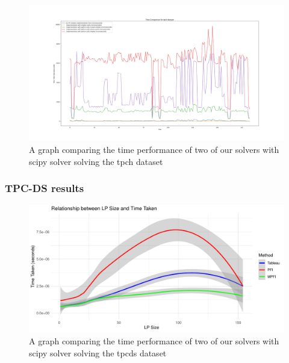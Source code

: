 \begin{figure}[p]
    \begin{adjustbox}{width=\paperwidth,center}
        \includegraphics[width=\paperwidth]{figures/all_scify_mpfi_pfi.png}
    \end{adjustbox}
    \caption{A graph comparing the time performance of two of
        our solvers with scipy solver solving the tpch dataset}
    \label{fig:all_time_tpch}
\end{figure}



\subsubsection{TPC-DS results}

\begin{figure}[!htb]
    \centering
    \includegraphics[width=\linewidth]{figures/methods_time_tpcds.pdf}
    \caption{A graph comparing the time performance of two of
    our solvers with scipy solver solving the tpcds dataset}
    \label{fig:methods_time_tpcds}
\end{figure}

